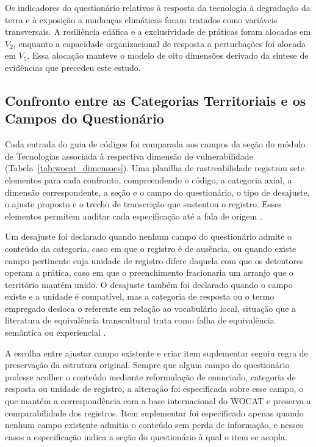 \documentclass[preprint,authoryear,12pt]{elsarticle}
\begin{document}
Os indicadores do questionário relativos à resposta da tecnologia à degradação da terra e à exposição a mudanças climáticas foram tratados como variáveis transversais. A resiliência edáfica e a exclusividade de práticas foram alocadas em $V_2$, enquanto a capacidade organizacional de resposta a perturbações foi alocada em $V_5$. Essa alocação manteve o modelo de oito dimensões derivado da síntese de evidências que precedeu este estudo.


\subsection{Confronto entre as Categorias Territoriais e os Campos do Questionário}

Cada entrada do guia de códigos foi comparada aos campos da seção do módulo de Tecnologias associada à respectiva dimensão de vulnerabilidade (Tabela~\ref{tab:wocat_dimensoes}). Uma planilha de rastreabilidade registrou sete elementos para cada confronto, compreendendo o código, a categoria axial, a dimensão correspondente, a seção e o campo do questionário, o tipo de desajuste, o ajuste proposto e o trecho de transcrição que sustentou o registro. Esses elementos permitem auditar cada especificação até a fala de origem \citep{Gioia2013}.

Um desajuste foi declarado quando nenhum campo do questionário admite o conteúdo da categoria, caso em que o registro é de ausência, ou quando existe campo pertinente cuja unidade de registro difere daquela com que os detentores operam a prática, caso em que o preenchimento fracionaria um arranjo que o território mantém unido. O desajuste também foi declarado quando o campo existe e a unidade é compatível, mas a categoria de resposta ou o termo empregado desloca o referente em relação ao vocabulário local, situação que a literatura de equivalência transcultural trata como falha de equivalência semântica ou experiencial \citep{Herdman1999,Beaton2000}.

A escolha entre ajustar campo existente e criar item suplementar seguiu regra de preservação da estrutura original. Sempre que algum campo do questionário pudesse acolher o conteúdo mediante reformulação de enunciado, categoria de resposta ou unidade de registro, a alteração foi especificada sobre esse campo, o que mantém a correspondência com a base internacional do WOCAT e preserva a comparabilidade dos registros. Item suplementar foi especificado apenas quando nenhum campo existente admitia o conteúdo sem perda de informação, e nesses casos a especificação indica a seção do questionário à qual o item se acopla.
\end{document}
